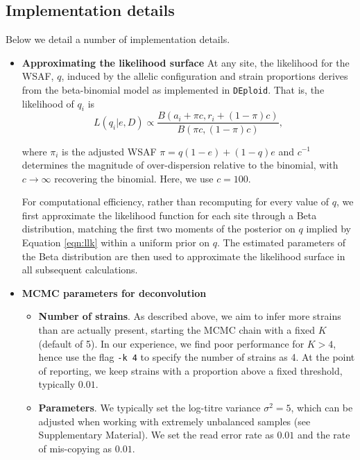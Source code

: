 \documentclass[9pt,lineno]{elife}
\begin{document}
\begin{appendixbox}
\subsection{Implementation details}

Below we detail a number of implementation details.

\begin{itemize}


\item {\bf Approximating the likelihood surface}
At any site, the likelihood for the WSAF, $q$, induced by the allelic configuration and strain proportions derives from the beta-binomial model as implemented in \texttt{DEploid}.  That is, the likelihood of $q_i$ is
\begin{equation}
L(q_{i}| e, D) \propto \frac{B(a_i + \pi c, r_i + (1-\pi) c)}{B(\pi c, (1-\pi) c)}, \label{eqn:llk}
\end{equation}

\noindent where $\pi_i$ is the adjusted WSAF $\pi = q(1-e)+(1-q)e$ and $c^{-1}$ determines the magnitude of over-dispersion relative to the binomial, with $c \to \infty$ recovering the binomial.  Here, we use $c=100$.

For computational efficiency, rather than recomputing for every value of $q$, we first approximate the likelihood function for each site through a Beta distribution, matching the first two moments of the posterior on $q$ implied by Equation \ref{eqn:llk} within a uniform prior on $q$.  The estimated parameters of the Beta distribution are then used to approximate the likelihood surface in all subsequent calculations.


\item {\bf MCMC parameters for deconvolution}

\begin{itemize}
\item {\bf Number of strains}. As described above, we aim to infer more strains than are actually present, starting the MCMC chain with a fixed $K$ (default of 5). In our experience, we find poor performance for $K>4$, hence use the flag {\tt -k 4} to specify the number of strains as 4. At the point of reporting, we keep strains with a proportion above a fixed threshold, typically $0.01$.

\item {\bf Parameters}. We typically set the log-titre variance $\sigma^2 = 5$, which can be adjusted when working with extremely unbalanced samples (see \citet{Zhu2017} Supplementary Material).  We set the read error rate as $0.01$ and the rate of mis-copying as $0.01$.


\end{itemize}
\end{itemize}
\end{appendixbox}
\end{document}
